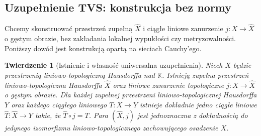 \documentclass[11pt,a4paper]{article}
\numberwithin{equation}{section}
\theoremstyle{plain}
\newtheorem{twierdzenie}{Twierdzenie}[section]
\theoremstyle{definition}
\theoremstyle{remark}
\newcommand{\K}{\mathbb K}
\begin{document}
\subsection{Uzupełnienie TVS: konstrukcja bez normy}

Chcemy skonstruować przestrzeń zupełną $\widehat X$
i ciągłe liniowe zanurzenie $j:X\to\widehat X$ o gęstym obrazie,
bez zakładania lokalnej wypukłości czy metryzowalności.
Poniższy dowód jest konstrukcją opartą na sieciach Cauchy'ego.

\begin{twierdzenie}[Istnienie i własność uniwersalna uzupełnienia]
\label{thm:tvs-completion}
Niech $X$ będzie przestrzenią liniowo-topologiczną Hausdorffa
nad $\K$. Istnieją zupełna przestrzeń liniowo-topologiczna
Hausdorffa $\widehat X$ oraz liniowe zanurzenie topologiczne
$j:X\to\widehat X$ o gęstym obrazie. Dla każdej zupełnej
przestrzeni liniowo-topologicznej Hausdorffa $Y$ oraz każdego
ciągłego liniowego $T:X\to Y$ istnieje dokładnie jedno
ciągłe liniowe $\widehat T:\widehat X\to Y$ takie,
że $\widehat T\circ j=T$. Para $(\widehat X,j)$ jest
jednoznaczna z dokładnością do jedynego izomorfizmu
liniowo-topologicznego zachowującego osadzenie $X$.
\end{twierdzenie}
\end{document}
